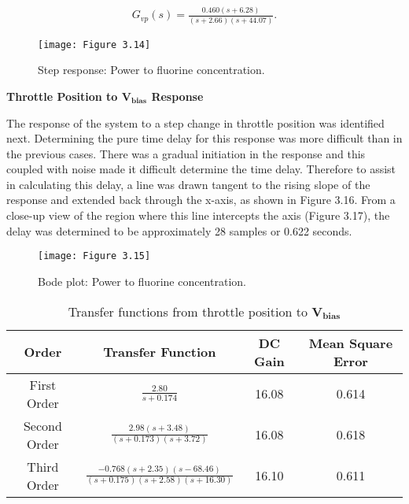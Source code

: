\begin{align}
	G_{vp}(s) = \frac{0.460(s+6.28)}{(s+2.66)(s+44.07)}.
\end{align}

\begin{figure}[H]
	\centering
	\texttt{[image: Figure 3.14]}
	\bf\caption{  Step response: Power to fluorine concentration.}
	\label{fig:3.14}
\end{figure}


\noindent \textbf{Throttle Position to $\mathbf{V_{bias}}$ Response}

The response of the system to a step change in throttle position was identified next. Determining the pure time delay for this response was more difficult than in the previous cases. There was a gradual initiation in the response and this coupled with noise made it difficult determine the time delay. Therefore to assist in calculating this delay, a line was drawn tangent to the rising slope of the response and extended back through the x-axis, as shown in Figure 3.16. From a close-up view of the region where this line intercepts the axis (Figure 3.17), the delay was determined to be approximately 28 samples or 0.622 seconds.

\begin{figure}[H]
	\centering
	\texttt{[image: Figure 3.15]}
	\bf\caption{  Bode plot: Power to fluorine concentration.}
	\label{fig:3.15}
\end{figure}

\begin{table}[H]
	\centering
	\renewcommand{\arraystretch}{2}
	\begin{tabular}{|c|c|c|c|}
		\hline
		Order & Transfer Function & DC Gain & Mean Square Error \\
		\hline 
		First Order & \large{$\frac{2.80}{s+0.174}$} & 16.08 & 0.614 \\
		\hline
		Second Order & \large{$\frac{2.98(s+3.48)}{(s+0.173)(s+3.72)}$} & 16.08 & 0.618 \\
		\hline
		Third Order & \large{$\frac{-0.768(s+2.35)(s-68.46)}{(s+0.175)(s+2.58)(s+16.30)}$} & 16.10 & 0.611 \\
		\hline
	\end{tabular}
	\renewcommand{\arraystretch}{1}
	\bf\caption{ Transfer functions from throttle position to $\mathbf{V_{bias}}$}
	\label{Table:3.4}
\end{table}

